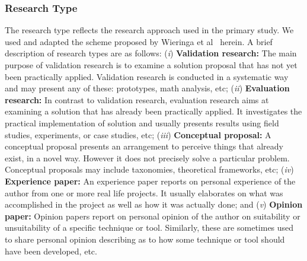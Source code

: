 



\subsubsection{Research Type}\label{research_type}

The research type reflects the research approach used in the primary study. We used and adapted the scheme proposed by Wieringa et al~\cite{Wieringa:2005:REP:1107677.1107683} herein. A brief description of research types are as follows: (\textit{i}) \textbf{Validation research:} The main purpose of validation research is to examine a solution proposal that has not yet been practically applied. Validation research is conducted in a systematic way and may present any of these: prototypes, math analysis, etc; (\textit{ii}) \textbf{Evaluation research:} In contrast to validation research, evaluation research aims at examining a solution that has already been practically applied. It investigates the practical implementation of solution and usually presents results using field studies, experiments, or case studies, etc; (\textit{iii}) \textbf{Conceptual proposal:} A conceptual proposal presents an arrangement to perceive things that already exist, in a novel way. However it does not precisely solve a particular problem. Conceptual proposals may include taxonomies, theoretical frameworks, etc; (\textit{iv}) \textbf{Experience paper:} An experience paper reports on personal experience of the author from one or more real life projects. It usually elaborates on what was accomplished in the project as well as how it was actually done; and (\textit{v}) \textbf{Opinion paper:} Opinion papers report on personal opinion of the author on suitability or unsuitability of a specific technique or tool. Similarly, these are sometimes used to share personal opinion describing as to how some technique or tool should have been developed, etc.

